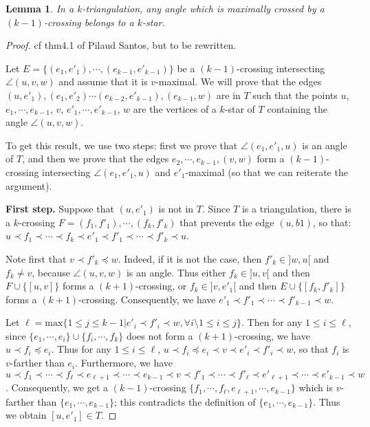 \documentclass{amsart}
\newtheorem{lemma}[theorem]{Lemma}
\theoremstyle{remark}
\newcommand*{\ktg}[0]{$k$-triangulation\xspace}
\newcommand{\cl}{\prec}
\newcommand{\cle}{\preccurlyeq}
\begin{document}
\begin{lemma}
In a \ktg, any angle which is maximally crossed by a $(k-1)$-crossing belongs to a $k$-star.
\end{lemma}
\begin{proof}
cf thm4.1 of  Pilaud Santos, but to be rewritten.





Let $E=\{(e_1,e'_1), \cdots , (e_{k-1},e'_{k-1})\}$ be a $(k - 1)$-crossing intersecting $\angle(u, v, w)$ and assume that it is $v$-maximal. 
We will prove that the edges $(u, e'_1),(e_1, e'_2)\cdots(e_{k-2}, e'_{k-1}), (e_{k-1}, w)$ are in $T$ such that the points $u$, $e_1,\cdots,e_{k-1}$, $v$, $e'_1,\cdots,e'_{k-1}$, $w$ are the vertices of a $k$-star of $T$ containing the angle $\angle(u, v, w)$. 

To get this result, we use two steps: first we prove that $\angle(e_1, e'_1, u)$ is an angle of $T$, and then we prove that the edges $e_2,\cdots, e_{k-1}, (v, w)$ form a $(k-1)$-crossing intersecting $\angle(e_1, e'_1, u)$ and $e'_1$-maximal (so that we can reiterate the argument).

{\bf First step.}
Suppose that $(u, e'_1)$ is not in $T$. 
Since $T$ is a triangulation, there is a $k$-crossing $F=(f_1, f'_1),\cdots, (f_k, f'_k)$ that prevents the edge $(u, b1)$, so that: $u \cl f_1 \cl \cdots \cl f_k \cl e'_1 \cl f'_1 \cl \cdots \cl f'_k \cl u$.

Note first that $v \cl f'_k \cle w$. Indeed, if it is not the case, then
$f'_k \in ]w, u[$ and $f_k \neq v$, because $\angle(u, v, w)$ is an angle. 
Thus either $f_k \in ]u, v[$ and then $F \cup \{[u, v]\}$ forms a $(k + 1)$-crossing, 
or $f_k \in ]v, e'_1[$ and then $E \cup \{[f_k, f'_k]\}$ forms a $(k + 1)$-crossing. 
Consequently, we have $e'_1 \cl f'_1 \cl \cdots \cl f'_{k-1} \cl w$.

Let $\ell = \text{max}\{1 \leq j \leq k - 1 | e'_i \cl f'_i \cl w, \forall i \setminus 1 \leq i \leq j\}$.
Then for any $1 \leq i \leq \ell$, since $\{e_1, \cdots , e_i\} \cup \{f_i, \cdots , f_k\}$ does not form
a $(k + 1)$-crossing, we have $u \cl f_i \cle e_i$. Thus for any $1 \leq i \leq \ell$, $u \cl f_i \cle e_i \cl v \cl e'_i \cl f'_i \cl w$, so that $f_i$
is $v$-farther than $e_i$.
Furthermore, we have $u \cl f_1 \cl \cdots \cl f_\ell \cl e_{\ell+1} \cl \cdots \cl e_{k-1} \cl v \cl f'_1 \cl \cdots \cl f'_\ell \cl e'_{\ell+1} \cl \cdots \cl e'_{k-1} \cl w$. 
Consequently, we get a $(k - 1)$-crossing $\{f_1, \cdots , f_\ell
, e_{\ell+1}, \cdots , e_{k-1}\}$ which is $v$-farther than $\{e_1, \cdots , e_{k-1}\}$; this contradicts the definition of $\{e_1, \cdots , e_{k-1}\}$. 
Thus we obtain $[u, e'_1] \in  T$.


\end{proof}
\end{document}
